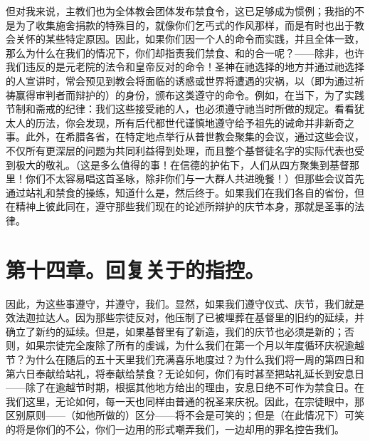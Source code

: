但对我来说，主教们也为全体教会团体发布禁食令，这已足够成为惯例；我指的不是为了收集施舍捐款的特殊目的，就像你们乞丐式的作风那样，而是有时也出于教会关怀的某些特定原因。因此，如果你们因一个人的命令而实践，并且全体一致，那么为什么在我们的情况下，你们却指责我们禁食、和的合一呢？——除非，也许我们违反的是元老院的法令和皇帝反对的命令！圣神在祂选择的地方并通过祂选择的人宣讲时，常会预见到教会将面临的诱惑或世界将遭遇的灾祸，以（即为通过祈祷赢得审判者而辩护的）的身份，颁布这类遵守的命令。例如，在当下，为了实践节制和斋戒的纪律：我们这些接受祂的人，也必须遵守祂当时所做的规定。看看犹太人的历法，你会发现，所有后代都世代谨慎地遵守给予祖先的诫命并非新奇之事。此外，在希腊各省，在特定地点举行从普世教会聚集的会议，通过这些会议，不仅所有更深层的问题为共同利益得到处理，而且整个基督徒名字的实际代表也受到极大的敬礼。（这是多么值得的事！在信德的护佑下，人们从四方聚集到基督那里！你们不太容易唱这首圣咏，除非你们与一大群人共进晚餐！）但那些会议首先通过站礼和禁食的操练，知道什么是，然后终于。如果我们在我们各自的省份，但在精神上彼此同在，遵守那些我们现在的论述所辩护的庆节本身，那就是圣事的法律。\par


\section{第十四章。回复关于的指控。}

因此，为这些事遵守，并遵守，我们。显然，如果我们遵守仪式、庆节，我们就是效法迦拉达人。因为那些宗徒反对，他压制了已被埋葬在基督里的旧约的延续，并确立了新约的延续。但是，如果基督里有了新造，我们的庆节也必须是新的；否则，如果宗徒完全废除了所有的虔诚，为什么我们在第一个月以年度循环庆祝逾越节？为什么在随后的五十天里我们充满喜乐地度过？为什么我们将一周的第四日和第六日奉献给站礼，将奉献给禁食？无论如何，你们有时甚至把站礼延长到安息日——除了在逾越节时期，根据其他地方给出的理由，安息日绝不可作为禁食日。在我们这里，无论如何，每一天也同样由普通的祝圣来庆祝。因此，在宗徒眼中，那区别原则——（如他所做的）区分——将不会是可笑的；但是（在此情况下）可笑的将是你们的不公，你们一边用的形式嘲弄我们，一边却用的罪名控告我们。\par


